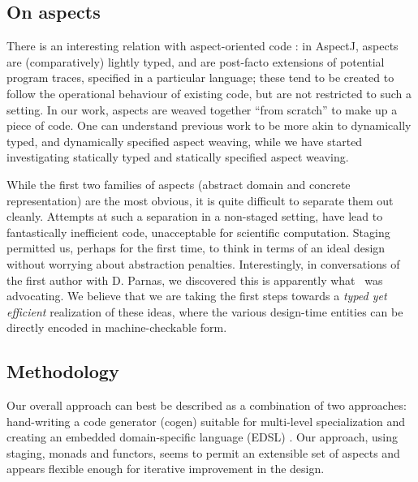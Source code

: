 \documentclass{elsart}
\newcommand{\oleg}[1]{{\it [Oleg says: #1]}}
\newcommand{\jacques}[1]{{\it [Jacques says: #1]}}
\begin{document}
\subsection{On aspects}

There is an interesting relation with aspect-oriented code
\cite{kiczales97aspectoriented}: in AspectJ, 
aspects are (comparatively) lightly typed, and are post-facto extensions of
potential program traces, specified in a particular language; these tend
to be created to follow the operational behaviour of existing code, but
are not restricted to such a setting.
In our work, aspects are weaved together ``from scratch'' to
make up a piece of code.  One can understand previous work to be
more akin to dynamically typed, and dynamically specified aspect weaving, while
we have started investigating statically typed and statically specified
aspect weaving.

While the first two families of aspects (abstract domain and concrete
representation) are the most obvious, it is quite difficult to
separate them out cleanly. Attempts at such a separation in a
non-staged setting, have lead to fantastically inefficient code,
unacceptable for scientific computation. Staging permitted us, perhaps
for the first time, to think in terms of an ideal design without
worrying about abstraction penalties.  Interestingly, in conversations
of the first author with D. Parnas, we discovered this is
apparently what~\cite{journals/cacm/parnas72a} was advocating.  We
believe that we are taking the first steps towards a \emph{typed yet
  efficient} realization of these ideas, where the various design-time
entities can be directly encoded in machine-checkable form.

\subsection{Methodology}

Our overall approach can best be described as a combination 
of two approaches: hand-writing a code generator (cogen) suitable
for multi-level specialization \cite{Gluck95,GluckJ97} and creating
an embedded domain-specific language (EDSL) \cite{edsl,WhenHowDSL}.
Our approach, using staging, monads and functors, seems to permit 
an extensible set of aspects and appears flexible enough for iterative
improvement in the design.

%
\end{document}
